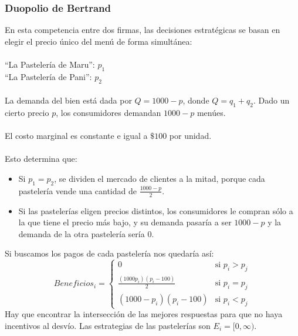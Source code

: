 \documentclass{article}
\begin{document}
            \subsubsection*{Duopolio de Bertrand}
                En esta competencia entre dos firmas, las decisiones estratégicas se basan en elegir el precio único del menú de forma simultánea: \\
                \\
                ``La Pastelería de Maru'': \(p_{1}\) \\
                ``La Pastelería de Pani'': \(p_{2}\) \\
                \\
                La demanda del bien está dada por \(Q = 1000-p\), donde \(Q = q_{1}+q_{2}\). Dado un cierto precio \(p\), los consumidores demandan \(1000-p\) menúes. \\
                \\
                El costo marginal es constante e igual a \(\mathdollar 100\) por unidad. \\
                \\
                Esto determina que:
                \begin{itemize}
                    \item Si \(p_{1} = p_{2}\), se dividen el mercado de clientes a la mitad, porque cada pastelería vende una cantidad de \(\frac{1000-p}{2}\).
                    \item Si las pastelerías eligen precios distintos, los consumidores le compran sólo a la que tiene el precio más bajo, y su demanda pasaría a ser \(1000-p\) y la demanda de la otra pastelería sería 0.
                \end{itemize}
                Si buscamos los pagos de cada pastelería nos quedaría así:
                \[
                    Beneficios_{i} =
                    \begin{cases} 
                    0 & \text{si } p_{i} > p_{j} \\ 
                    \frac{(1000p_{i})(p_{i}-100)}{2} & \text{si } p_{i} = p_{j} \\
                    (1000-p_{i})(p_{i}-100) & \text{si } p_{i} < p_{j}
                    \end{cases}
                \]
                Hay que encontrar la intersección de las mejores respuestas para que no haya incentivos al desvío. Las estrategias de las pastelerías son \(E_{i} = [0, \infty)\).
\end{document}
